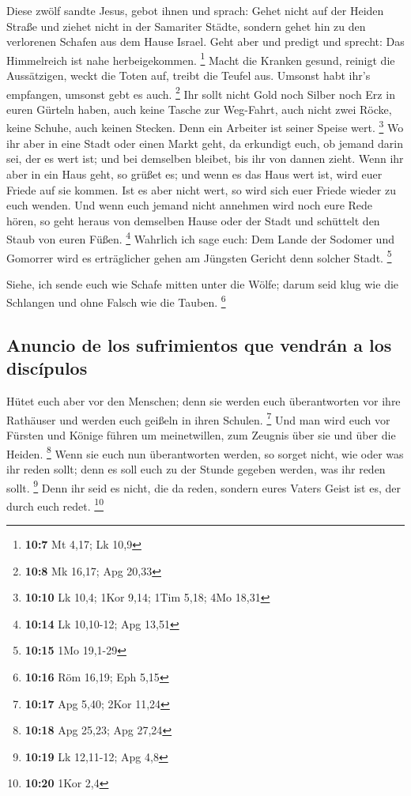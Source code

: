  Diese zwölf sandte Jesus, gebot ihnen und sprach: Gehet
nicht auf der Heiden Straße und ziehet nicht in der Samariter Städte,
 sondern gehet hin zu den verlorenen Schafen aus dem Hause
Israel.  Geht aber und predigt und sprecht: Das
Himmelreich ist nahe herbeigekommen. \footnote{\textbf{10:7} Mt 4,17; Lk
  10,9}  Macht die Kranken gesund, reinigt die
Aussätzigen, weckt die Toten auf, treibt die Teufel aus. Umsonst habt
ihr's empfangen, umsonst gebt es auch. \footnote{\textbf{10:8} Mk 16,17;
  Apg 20,33}  Ihr sollt nicht Gold noch Silber noch Erz in
euren Gürteln haben,  auch keine Tasche zur Weg-Fahrt,
auch nicht zwei Röcke, keine Schuhe, auch keinen Stecken. Denn ein
Arbeiter ist seiner Speise wert. \footnote{\textbf{10:10} Lk 10,4; 1Kor
  9,14; 1Tim 5,18; 4Mo 18,31}  Wo ihr aber in eine Stadt
oder einen Markt geht, da erkundigt euch, ob jemand darin sei, der es
wert ist; und bei demselben bleibet, bis ihr von dannen zieht.
 Wenn ihr aber in ein Haus geht, so grüßet es;
 und wenn es das Haus wert ist, wird euer Friede auf sie
kommen. Ist es aber nicht wert, so wird sich euer Friede wieder zu euch
wenden.  Und wenn euch jemand nicht annehmen wird noch
eure Rede hören, so geht heraus von demselben Hause oder der Stadt und
schüttelt den Staub von euren Füßen. \footnote{\textbf{10:14} Lk
  10,10-12; Apg 13,51}  Wahrlich ich sage euch: Dem Lande
der Sodomer und Gomorrer wird es erträglicher gehen am Jüngsten Gericht
denn solcher Stadt. \footnote{\textbf{10:15} 1Mo 19,1-29}

 Siehe, ich sende euch wie Schafe mitten unter die Wölfe;
darum seid klug wie die Schlangen und ohne Falsch wie die Tauben.
\footnote{\textbf{10:16} Röm 16,19; Eph 5,15}

\hypertarget{anuncio-de-los-sufrimientos-que-vendruxe1n-a-los-discuxedpulos}{%
\subsection{Anuncio de los sufrimientos que vendrán a los
discípulos}\label{anuncio-de-los-sufrimientos-que-vendruxe1n-a-los-discuxedpulos}}

 Hütet euch aber vor den Menschen; denn sie werden euch
überantworten vor ihre Rathäuser und werden euch geißeln in ihren
Schulen. \footnote{\textbf{10:17} Apg 5,40; 2Kor 11,24} 
Und man wird euch vor Fürsten und Könige führen um meinetwillen, zum
Zeugnis über sie und über die Heiden. \footnote{\textbf{10:18} Apg
  25,23; Apg 27,24}  Wenn sie euch nun überantworten
werden, so sorget nicht, wie oder was ihr reden sollt; denn es soll euch
zu der Stunde gegeben werden, was ihr reden sollt. \footnote{\textbf{10:19}
  Lk 12,11-12; Apg 4,8}  Denn ihr seid es nicht, die da
reden, sondern eures Vaters Geist ist es, der durch euch redet.
\footnote{\textbf{10:20} 1Kor 2,4}

